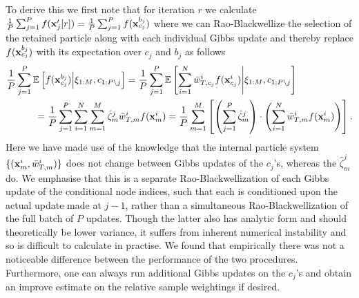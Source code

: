 To derive this we first note that for iteration $r$ we calculate
$\frac{1}{P}\sum_{j=1}^P f(\mathbf{x}_j'[r]) = \frac{1}{P}\sum_{j=1}^P f(\mathbf{x}_{c_j}^{b_j})$
where we can Rao-Blackwellize the selection of the retained particle along with each individual Gibbs update
and thereby replace $f(\mathbf{x}_{c_j}^{b_j})$ with its expectation over $c_j$ and $b_j$
as follows
\begin{align*}
\frac{1}{P} & \sum_{j=1}^P \mathbb{E} \left[f(\mathbf{x}_{c_j}^{b_j}) \middle| \xi_{1:M}, c_{1:P\backslash j} \right] =
\frac{1}{P}\sum_{j=1}^P \mathbb{E} \left[\sum_{i=1}^N \bar w_{T,c_j}^i  f(\mathbf{x}_{c_j}^{i}) \middle| \xi_{1:M}, c_{1:P\backslash j} \right] \\ 
&\quad \quad = \frac{1}{P}\sum_{j=1}^P \sum_{i=1}^N \sum_{m=1}^M \hat \zeta_m^j \bar w_{T,m}^i  f(\mathbf{x}_{m}^{i})
= \frac{1}{P} \sum_{m=1}^M  \left[\left(\sum_{j=1}^P \hat \zeta_m^j \right) \cdot \left(\sum_{i=1}^N \bar w_{T,m}^i  f(\mathbf{x}_{m}^{i}) \right)\right].
\end{align*}
Here we have made use of the knowledge that the internal particle system $\{(\mathbf{x}_{m}^{i},\bar w_{T,m}^i)\}$ does not change between Gibbs updates of the $c_j$'s, whereas the $\hat \zeta_m^j$ do.  We emphasise that this is a separate Rao-Blackwellization of each Gibbs update of the conditional node indices, such that each is conditioned upon the actual update made at $j-1$, rather than a simultaneous Rao-Blackwellization of the full batch of $P$ updates.  Though the latter also has analytic form and should theoretically be lower variance, it suffers from inherent numerical instability and so is difficult to calculate in practise.  We found that empirically there was not a noticeable difference between the performance of the two procedures.  Furthermore, one can always run additional Gibbs updates on the $c_j$'s and obtain an improve estimate on the relative sample weightings if desired.

